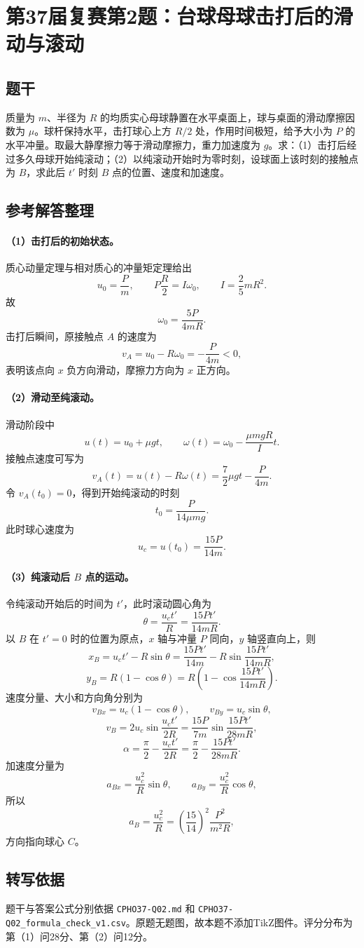 \section{第37届复赛第2题：台球母球击打后的滑动与滚动}
\subsection{题干}
质量为 $m$、半径为 $R$ 的均质实心母球静置在水平桌面上，球与桌面的滑动摩擦因数为 $\mu$。球杆保持水平，击打球心上方 $R/2$ 处，作用时间极短，给予大小为 $P$ 的水平冲量。取最大静摩擦力等于滑动摩擦力，重力加速度为 $g$。求：（1）击打后经过多久母球开始纯滚动；（2）以纯滚动开始时为零时刻，设球面上该时刻的接触点为 $B$，求此后 $t'$ 时刻 $B$ 点的位置、速度和加速度。

\subsection{参考解答整理}
\paragraph{（1）击打后的初始状态。} 质心动量定理与相对质心的冲量矩定理给出
\[
u_0=\frac Pm,
\qquad
P\frac R2=I\omega_0,
\qquad
I=\frac25mR^2.
\]
故
\[
\omega_0=\frac{5P}{4mR}.
\]
击打后瞬间，原接触点 $A$ 的速度为
\[
v_A=u_0-R\omega_0=-\frac P{4m}<0,
\]
表明该点向 $x$ 负方向滑动，摩擦力方向为 $x$ 正方向。

\paragraph{（2）滑动至纯滚动。} 滑动阶段中
\[
u(t)=u_0+\mu gt,
\qquad
\omega(t)=\omega_0-\frac{\mu mgR}{I}t.
\]
接触点速度可写为
\[
v_A(t)=u(t)-R\omega(t)=\frac72\mu gt-\frac P{4m}.
\]
令 $v_A(t_0)=0$，得到开始纯滚动的时刻
\[
\boxed{t_0=\frac{P}{14\mu mg}.}
\]
此时球心速度为
\[
\boxed{u_c=u(t_0)=\frac{15P}{14m}.}
\]

\paragraph{（3）纯滚动后 $B$ 点的运动。} 令纯滚动开始后的时间为 $t'$，此时滚动圆心角为
\[
\theta=\frac{u_ct'}R=\frac{15Pt'}{14mR}.
\]
以 $B$ 在 $t'=0$ 时的位置为原点，$x$ 轴与冲量 $P$ 同向，$y$ 轴竖直向上，则
\[
\boxed{x_B=u_ct'-R\sin\theta
=\frac{15Pt'}{14m}-R\sin\frac{15Pt'}{14mR},}
\]
\[
\boxed{y_B=R(1-\cos\theta)
=R\left(1-\cos\frac{15Pt'}{14mR}\right).}
\]
速度分量、大小和方向角分别为
\[
v_{Bx}=u_c(1-\cos\theta),\qquad v_{By}=u_c\sin\theta,
\]
\[
\boxed{v_B=2u_c\sin\frac{u_ct'}{2R}
=\frac{15P}{7m}\sin\frac{15Pt'}{28mR},}
\]
\[
\boxed{\alpha=\frac\pi2-\frac{u_ct'}{2R}
=\frac\pi2-\frac{15Pt'}{28mR}.}
\]
加速度分量为
\[
a_{Bx}=\frac{u_c^2}{R}\sin\theta,
\qquad
a_{By}=\frac{u_c^2}{R}\cos\theta,
\]
所以
\[
\boxed{a_B=\frac{u_c^2}{R}=\left(\frac{15}{14}\right)^2\frac{P^2}{m^2R},}
\]
方向指向球心 $C$。

\subsection{转写依据}
题干与答案公式分别依据 \texttt{CPHO37-Q02.md} 和 \texttt{CPHO37-Q02\_formula\_check\_v1.csv}。原题无题图，故本题不添加TikZ图件。评分分布为第（1）问28分、第（2）问12分。
